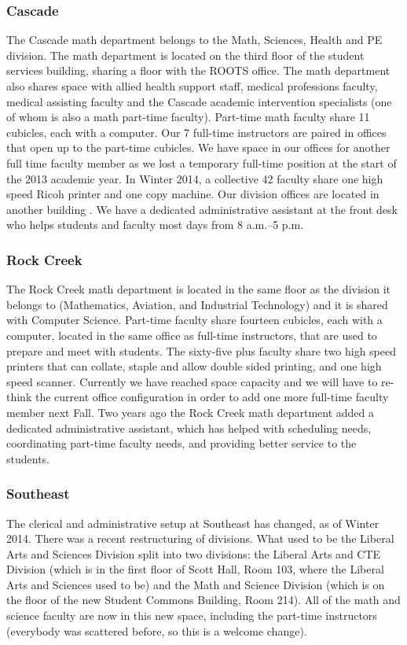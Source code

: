 \subsubsection{Cascade}
The Cascade math department belongs to the Math, Sciences, Health and PE
division. The math department is located on the third floor of the student
services building, sharing a floor with the ROOTS office. The math department
also shares space with allied health support staff, medical professions
faculty, medical assisting faculty and the Cascade academic intervention
specialists (one of whom is also a math part-time faculty).  Part-time math
faculty share 11 cubicles, each with a computer. Our 7 full-time instructors
are paired in offices that open up to the part-time cubicles. We have space in
our offices for another full time faculty member as we lost a temporary
full-time position at the start of the 2013 academic year. In Winter 2014, a
collective 42 faculty share one high speed Ricoh printer and one copy machine.
Our division offices are located in another building . We have a dedicated
administrative assistant at the front desk who helps students and faculty most
days from 8 {\sc a.m.--5 p.m.}

\subsubsection{Rock Creek}
The Rock Creek math department is located in the same floor as the division it
belongs to (Mathematics, Aviation, and Industrial Technology) and it is shared
with Computer Science.   Part-time faculty share fourteen cubicles, each with a
computer, located in the same office as full-time instructors, that are used to
prepare and meet with students. The sixty-five plus faculty share two high
speed printers that can collate, staple and allow double sided printing, and
one high speed scanner. Currently we have reached space capacity and we will
have to re-think the current office configuration in order to add one more
full-time faculty member next Fall.  Two years ago the Rock Creek math
department added a dedicated administrative assistant, which has helped with
scheduling needs, coordinating part-time faculty needs, and providing better
service to the students.

\subsubsection{Southeast}
The clerical and administrative setup at Southeast has changed, as of Winter
2014. There was a recent restructuring of divisions. What used to be the
Liberal Arts and Sciences Division split into two divisions: the Liberal Arts
and CTE Division (which is in the first floor of Scott Hall, Room 103, where
the Liberal Arts and Sciences used to be) and the Math and Science Division
(which is on the  floor of the new Student Commons Building, Room 214).
All of the math and science faculty are now in this new space, including the
part-time instructors (everybody was scattered before, so this is a welcome
change).

